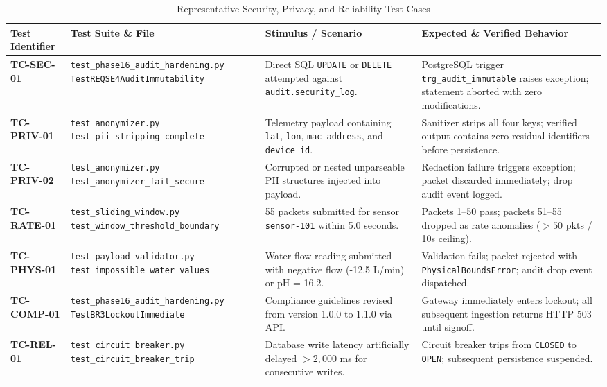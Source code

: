 \begin{table}[H]
\centering
\caption{Representative Security, Privacy, and Reliability Test Cases}
\label{tab:representative_tests}
\scriptsize
\begin{tabularx}{\linewidth}{@{}l p{3.2cm} p{3.8cm} X@{}}
\toprule
\textbf{Test Identifier} & \textbf{Test Suite \& File} & \textbf{Stimulus / Scenario} & \textbf{Expected \& Verified Behavior} \\
\midrule
\textbf{TC-SEC-01} & \texttt{test\_phase16\_audit\_hardening.py} \newline \texttt{TestREQSE4AuditImmutability} & Direct SQL \texttt{UPDATE} or \texttt{DELETE} attempted against \texttt{audit.security\_log}. & PostgreSQL trigger \texttt{trg\_audit\_immutable} raises exception; statement aborted with zero modifications. \\
\midrule
\textbf{TC-PRIV-01} & \texttt{test\_anonymizer.py} \newline \texttt{test\_pii\_stripping\_complete} & Telemetry payload containing \texttt{lat}, \texttt{lon}, \texttt{mac\_address}, and \texttt{device\_id}. & Sanitizer strips all four keys; verified output contains zero residual identifiers before persistence. \\
\midrule
\textbf{TC-PRIV-02} & \texttt{test\_anonymizer.py} \newline \texttt{test\_anonymizer\_fail\_secure} & Corrupted or nested unparseable PII structures injected into payload. & Redaction failure triggers exception; packet discarded immediately; drop audit event logged. \\
\midrule
\textbf{TC-RATE-01} & \texttt{test\_sliding\_window.py} \newline \texttt{test\_window\_threshold\_boundary} & 55 packets submitted for sensor \texttt{sensor-101} within 5.0 seconds. & Packets 1--50 pass; packets 51--55 dropped as rate anomalies ($> 50$ pkts / 10s ceiling). \\
\midrule
\textbf{TC-PHYS-01} & \texttt{test\_payload\_validator.py} \newline \texttt{test\_impossible\_water\_values} & Water flow reading submitted with negative flow (-12.5 L/min) or pH = 16.2. & Validation fails; packet rejected with \texttt{PhysicalBoundsError}; audit drop event dispatched. \\
\midrule
\textbf{TC-COMP-01} & \texttt{test\_phase16\_audit\_hardening.py} \newline \texttt{TestBR3LockoutImmediate} & Compliance guidelines revised from version 1.0.0 to 1.1.0 via API. & Gateway immediately enters lockout; all subsequent ingestion returns HTTP 503 until signoff. \\
\midrule
\textbf{TC-REL-01} & \texttt{test\_circuit\_breaker.py} \newline \texttt{test\_circuit\_breaker\_trip} & Database write latency artificially delayed $> 2,000$ ms for consecutive writes. & Circuit breaker trips from \texttt{CLOSED} to \texttt{OPEN}; subsequent persistence suspended. \\
\bottomrule
\end{tabularx}
\end{table}
